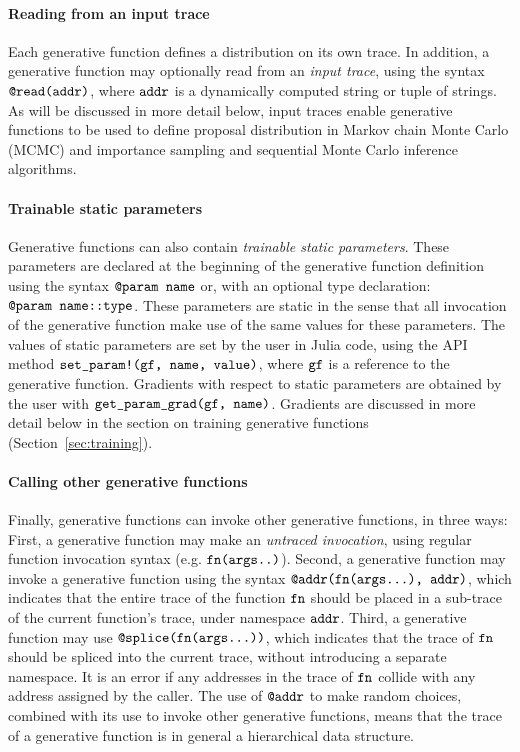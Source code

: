\paragraph{Reading from an input trace}
Each generative function defines a distribution on its own trace.
In addition, a generative function may optionally read from an \emph{input trace}, using the syntax $\mbox{\texttt{@read(addr)}}$, where $\mbox{\texttt{addr}}$ is a dynamically computed string or tuple of strings.
As will be discussed in more detail below, input traces enable generative functions to be used to define proposal distribution in Markov chain Monte Carlo (MCMC) and importance sampling and sequential Monte Carlo inference algorithms.

\paragraph{Trainable static parameters}
Generative functions can also contain \emph{trainable static parameters}.
These parameters are declared at the beginning of the generative function definition using the syntax $\mbox{\texttt{@param name}}$ or, with an optional type declaration: $\mbox{\texttt{@param name::type}}$.
These parameters are static in the sense that all invocation of the generative function make use of the same values for these parameters.
The values of static parameters are set by the user in Julia code, using the API method $\mbox{\texttt{set\_param!(gf, name, value)}}$, where $\mbox{\texttt{gf}}$ is a reference to the generative function.
Gradients with respect to static parameters are obtained by the user with $\mbox{\texttt{get\_param\_grad(gf, name)}}$.
Gradients are discussed in more detail below in the section on training generative functions (Section~\ref{sec:training}).

\paragraph{Calling other generative functions}
Finally, generative functions can invoke other generative functions, in three ways:
First, a generative function may make an \emph{untraced invocation}, using regular function invocation syntax (e.g. $\mbox{\texttt{fn(args..)}}$).
Second, a generative function may invoke a generative function using the syntax $\mbox{\texttt{@addr(fn(args...), addr)}}$, which indicates that the entire trace of the function $\mbox{\texttt{fn}}$ should be placed in a sub-trace of the current function's trace, under namespace $\mbox{\texttt{addr}}$.
Third, a generative function may use $\mbox{\texttt{@splice(fn(args...))}}$, which indicates that the trace of $\mbox{\texttt{fn}}$ should be spliced into the current trace, without introducing a separate namespace.
It is an error if any addresses in the trace of $\mbox{\texttt{fn}}$ collide with any address assigned by the caller.
The use of $\mbox{\texttt{@addr}}$ to make random choices, combined with its use to invoke other generative functions, means that the trace of a generative function is in general a hierarchical data structure.

